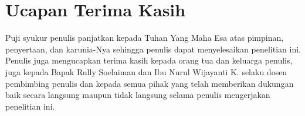 \section*{Ucapan Terima Kasih}
Puji syukur penulis panjatkan kepada Tuhan Yang Maha Esa atas pimpinan, penyertaan, dan karunia-Nya sehingga penulis dapat menyelesaikan penelitian ini. Penulis juga mengucapkan terima kasih kepada orang tua dan keluarga penulis, juga kepada Bapak Rully Soelaiman dan Ibu Nurul Wijayanti K. selaku dosen pembimbing penulis dan kepada semua pihak yang telah memberikan dukungan baik secara langsung maupun tidak langsung selama penulis mengerjakan penelitian ini.


\ifCLASSOPTIONcaptionsoff
  \newpage
\fi
